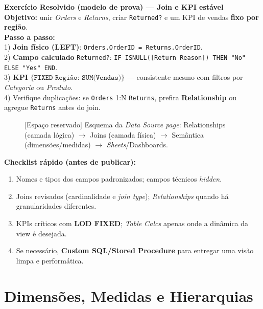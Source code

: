 \begin{SolvedBox}
\textbf{Exercício Resolvido (modelo de prova) — Join e KPI estável}\\[4pt]
\textbf{Objetivo:} unir \textit{Orders} e \textit{Returns}, criar \texttt{Returned?} e um KPI de vendas \textbf{fixo por região}.\\[4pt]
\textbf{Passo a passo:}\\
1) \textbf{Join físico (LEFT)}: \texttt{Orders.OrderID = Returns.OrderID}.\\
2) \textbf{Campo calculado} \texttt{Returned?}: \texttt{IF ISNULL([Return Reason]) THEN "No" ELSE "Yes" END}.\\
3) \textbf{KPI} \(\{\texttt{FIXED Região: SUM(Vendas)}\}\) — consistente mesmo com filtros por \textit{Categoria} ou \textit{Produto}.\\
4) Verifique duplicações: se \texttt{Orders} 1:N \texttt{Returns}, prefira \textbf{Relationship} ou agregue \texttt{Returns} antes do join.
\end{SolvedBox}

\begin{figure}[H]
\centering
\fbox{\rule{0pt}{120pt}\rule{0.92\linewidth}{0pt}}
\caption{[Espaço reservado] Esquema da \textit{Data Source page}: Relationships (camada lógica) \(\rightarrow\) Joins (camada física) \(\rightarrow\) Semântica (dimensões/medidas) \(\rightarrow\) \textit{Sheets}/Dashboards.}
\end{figure}

\begin{NoteBox}
\textbf{Checklist rápido (antes de publicar):}
\begin{enumerate}[leftmargin=*]
  \item Nomes e tipos dos campos padronizados; campos técnicos \textit{hidden}.  
  \item Joins revisados (cardinalidade e \textit{join type}); \textit{Relationships} quando há granularidades diferentes.  
  \item KPIs críticos com \textbf{LOD FIXED}; \textit{Table Calcs} apenas onde a dinâmica da view é desejada.  
  \item Se necessário, \textbf{Custom SQL/Stored Procedure} para entregar uma visão limpa e performática.
\end{enumerate}
\end{NoteBox}


\section{Dimensões, Medidas e Hierarquias}

